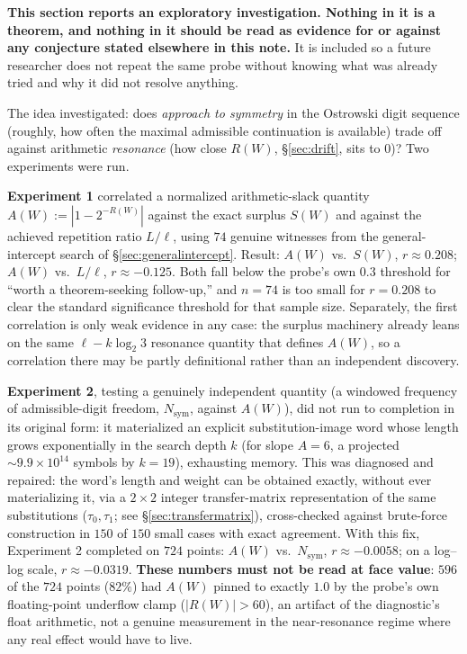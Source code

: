 \documentclass[11pt]{article}
\begin{document}
\textbf{This section reports an exploratory investigation. Nothing in it is a theorem, and nothing in it should be read as evidence for or against any conjecture stated elsewhere in this note.} It is included so a future researcher does not repeat the same probe without knowing what was already tried and why it did not resolve anything.

The idea investigated: does \emph{approach to symmetry} in the Ostrowski digit sequence (roughly, how often the maximal admissible continuation is available) trade off against arithmetic \emph{resonance} (how close $R(W)$, \S\ref{sec:drift}, sits to $0$)? Two experiments were run.

\textbf{Experiment 1} correlated a normalized arithmetic-slack quantity $A(W):=|1-2^{-R(W)}|$ against the exact surplus $S(W)$ and against the achieved repetition ratio $L/\ell$, using $74$ genuine witnesses from the general-intercept search of \S\ref{sec:generalintercept}. Result: $A(W)$ vs.\ $S(W)$, $r\approx0.208$; $A(W)$ vs.\ $L/\ell$, $r\approx-0.125$. Both fall below the probe's own $0.3$ threshold for ``worth a theorem-seeking follow-up,'' and $n=74$ is too small for $r=0.208$ to clear the standard significance threshold for that sample size. Separately, the first correlation is only weak evidence in any case: the surplus machinery already leans on the same $\ell-k\log_2 3$ resonance quantity that defines $A(W)$, so a correlation there may be partly definitional rather than an independent discovery.

\textbf{Experiment 2}, testing a genuinely independent quantity (a windowed frequency of admissible-digit freedom, $N_{\text{sym}}$, against $A(W)$), did not run to completion in its original form: it materialized an explicit substitution-image word whose length grows exponentially in the search depth $k$ (for slope $A=6$, a projected $\sim9.9\times10^{14}$ symbols by $k=19$), exhausting memory. This was diagnosed and repaired: the word's length and weight can be obtained exactly, without ever materializing it, via a $2\times2$ integer transfer-matrix representation of the same substitutions ($\tau_0,\tau_1$; see \S\ref{sec:transfermatrix}), cross-checked against brute-force construction in $150$ of $150$ small cases with exact agreement. With this fix, Experiment 2 completed on $724$ points: $A(W)$ vs.\ $N_{\text{sym}}$, $r\approx-0.0058$; on a log--log scale, $r\approx-0.0319$. \textbf{These numbers must not be read at face value}: $596$ of the $724$ points ($82\%$) had $A(W)$ pinned to exactly $1.0$ by the probe's own floating-point underflow clamp ($|R(W)|>60$), an artifact of the diagnostic's float arithmetic, not a genuine measurement in the near-resonance regime where any real effect would have to live.
\end{document}

